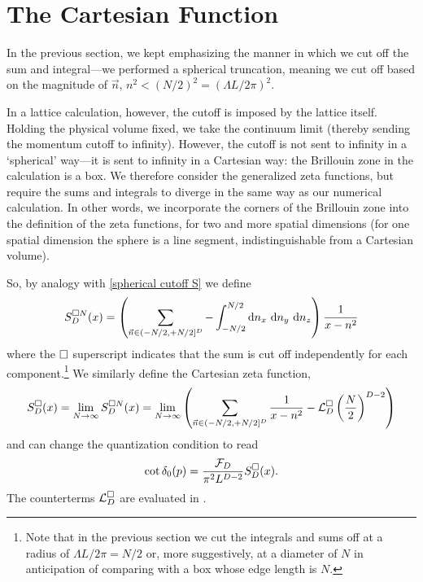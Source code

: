 \section{The Cartesian Function}\label{sec:cartesian}

In the previous section, we kept emphasizing the manner in which we cut off the sum and integral---we performed a spherical truncation, meaning we cut off based on the magnitude of $\vec{n}$, $n^2 < (N/2)^2 = (\Lambda L/2\pi)^2$.

In a lattice calculation, however, the cutoff is imposed by the lattice itself.
Holding the physical volume fixed, we take the continuum limit (thereby sending the momentum cutoff to infinity).
However, the cutoff is not sent to infinity in a `spherical' way---it is sent to infinity in a Cartesian way: the Brillouin zone in the calculation is a box.
We therefore consider the generalized zeta functions, but require the sums and integrals to diverge in the same way as our numerical calculation.
In other words, we incorporate the corners of the Brillouin zone into the definition of the zeta functions, for two and more spatial dimensions (for one spatial dimension the sphere is a line segment, indistinguishable from a Cartesian volume).

So, by analogy with \eqref{spherical cutoff S} we define
\begin{equation}
        S^{\cartesian N}_D(x)
        = \left(
            \sum_{\vec{n} \in (-N/2, +N/2]^D}
            -
            \int_{-N/2}^{N/2} \mathrm{d}n_x\ \mathrm{d}n_y\ \mathrm{d}n_z
        \right) \frac{1}{x-n^2}
\end{equation}
where the $\square$ superscript indicates that the sum is cut off independently for each component.\footnote{Note that in the previous section we cut the integrals and sums off at a radius of $\Lambda L / 2\pi = N/2$ or, more suggestively, at a diameter of $N$ in anticipation of comparing with a box whose edge length is $N$.}
We similarly define the Cartesian zeta function,
\begin{equation}\label{eq:cartesian S}
    S^{\square}_D(x)
    =
    \lim_{N\rightarrow\infty} S^{\square N}_D(x)
    =
    \lim_{N\rightarrow\infty}\left( \sum_{\vec{n} \in (-N/2, +N/2]^D} \frac{1}{x-n^2} - \mathcal{L}_D^\square \left(\frac{N}{2}\right)^{D-2}\right)
\end{equation}
and can change the quantization condition to read
\begin{equation}\label{eq:cartesian quantization}
    \cot \delta_0(p) = \frac{\mathcal{F}_D}{\pi^2 L^{D-2}} S^\square_D(x).
\end{equation}
The counterterms $\mathcal{L}_D^\square$ are evaluated in .


